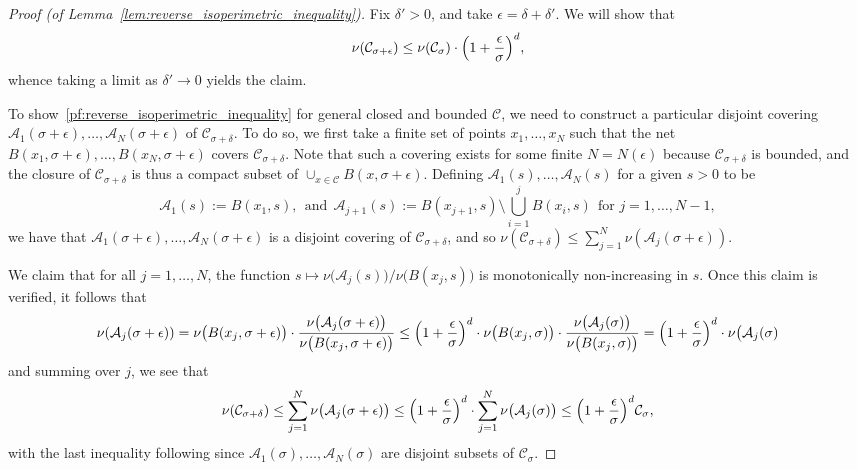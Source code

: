 \documentclass{article}
\newcommand{\1}{\mathbf{1}}
\newcommand{\mc}[1]{\mathcal{#1}}
\theoremstyle{definition}
\theoremstyle{remark}
\begin{document}
\begin{proof}[Proof (of Lemma~\ref{lem:reverse_isoperimetric_inequality})] 
	Fix $\delta' > 0$, and take $\epsilon = \delta + \delta'$. We will show that
	\begin{equation*}
	\label{pf:reverse_isoperimetric_inequality}
	\nu(\mc{C}_{\sigma + \epsilon}) \leq \nu(\mc{C}_{\sigma}) \cdot \Bigl(1 + \frac{\epsilon}{\sigma}\Bigr)^d,
	\end{equation*}
	whence taking a limit as $\delta' \to 0$ yields the claim.
	
	To show~\eqref{pf:reverse_isoperimetric_inequality} for general closed and bounded $\mc{C}$, we need to construct a particular disjoint covering $\mc{A}_1(\sigma + \epsilon), \ldots, \mc{A}_N(\sigma + \epsilon)$ of $\mc{C}_{\sigma + \delta}$. To do so, we first take a finite set of points $x_1,\ldots,x_N$ such that the net $B(x_1,\sigma + \epsilon),\ldots,B(x_N,\sigma + \epsilon)$ covers $\mc{C}_{\sigma + \delta}$.  Note that such a covering exists for some finite $N = N(\epsilon)$ because $\mc{C}_{\sigma + \delta}$ is bounded, and the closure of $\mc{C}_{\sigma + \delta}$ is thus a compact subset of $\cup_{x \in \mc{C}} B(x,\sigma + \epsilon)$. Defining $\mc{A}_1(s), \ldots, \mc{A}_N(s)$ for a given $s > 0$ to be
	\begin{equation*}
	\mc{A}_1(s) := B(x_1,s),~~\textrm{and}~~ \mc{A}_{j + 1}(s) := B(x_{j + 1},s) \setminus \bigcup_{i = 1}^{j} B(x_i,s) ~~\textrm{for $j = 1,\ldots,N - 1$},
	\end{equation*}
	we have that $\mc{A}_1(\sigma + \epsilon),\ldots,\mc{A}_N(\sigma + \epsilon)$ is a disjoint covering of $\mc{C}_{\sigma + \delta}$, and so $\nu(\mc{C}_{\sigma + \delta}) \leq \sum_{j = 1}^{N} \nu(\mc{A}_j(\sigma + \epsilon))$. 
	
	We claim that for all $j = 1,\ldots,N$, the function $s \mapsto \nu\bigl(\mc{A}_j(s)\bigr)/\nu\bigl(B(x_j,s)\bigr)$ is monotonically non-increasing in $s$. Once this claim is verified, it follows that
	\begin{equation*}
	\nu(\mc{A}_j(\sigma + \epsilon)) = \nu\bigl(B(x_j,\sigma + \epsilon)\bigr) \cdot \frac{\nu\bigl(\mc{A}_j(\sigma + \epsilon)\bigr)}{\nu\bigl(B(x_j,\sigma + \epsilon)\bigr)} \leq \Bigl(1 + \frac{\epsilon}{\sigma}\Bigr)^d \cdot  \nu\bigl(B(x_j,\sigma)\bigr) \cdot \frac{\nu\bigl(\mc{A}_j(\sigma)\bigr)}{\nu\bigl(B(x_j,\sigma)\bigr)} = \Bigl(1 + \frac{\epsilon}{\sigma}\Bigr)^d \cdot \nu\bigl(\mc{A}_j(\sigma)
	\end{equation*}
	and summing over $j$, we see that
	\begin{equation*}
	\nu(\mc{C}_{\sigma + \delta}) \leq \sum_{j = 1}^{N} \nu\bigl(\mc{A}_j(\sigma + \epsilon)\bigr) \leq \Bigl(1 + \frac{\epsilon}{\sigma}\Bigr)^d \cdot \sum_{j = 1}^{N} \nu\bigl(\mc{A}_j(\sigma)\bigr) \leq \Bigl(1 + \frac{\epsilon}{\sigma}\Bigr)^d \mc{C}_{\sigma},
	\end{equation*}
	with the last inequality following since $\mc{A}_1(\sigma),\ldots,\mc{A}_N(\sigma)$ are disjoint subsets of $\mc{C}_{\sigma}$.
	

\end{proof}
\end{document}
